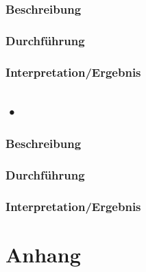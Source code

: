 \documentclass[12pt,a4paper]{article}
\begin{document}
		\subsubsection{Beschreibung}
		\subsubsection{Durchführung}
		\subsubsection{Interpretation/Ergebnis}
	\subsection{•}
		\subsubsection{Beschreibung}
		\subsubsection{Durchführung}
		\subsubsection{Interpretation/Ergebnis}
		
\section{Anhang}
\label{sec:Anhang}
	
\end{document}
